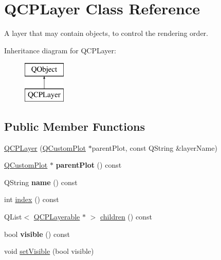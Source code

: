 \hypertarget{class_q_c_p_layer}{}\section{Q\+C\+P\+Layer Class Reference}
\label{class_q_c_p_layer}


A layer that may contain objects, to control the rendering order.  


Inheritance diagram for Q\+C\+P\+Layer\+:\begin{figure}[H]
\begin{center}
\leavevmode
\includegraphics[height=2.000000cm]{class_q_c_p_layer}
\end{center}
\end{figure}
\subsection*{Public Member Functions}
\begin{DoxyCompactItemize}
\item 
\hyperlink{class_q_c_p_layer_a5d0657fc86d624e5efbe930ef21af718}{Q\+C\+P\+Layer} (\hyperlink{class_q_custom_plot}{Q\+Custom\+Plot} $\ast$parent\+Plot, const Q\+String \&layer\+Name)
\item 
\hypertarget{class_q_c_p_layer_a5520019787482e13857ebe631c27c3fa}{}\label{class_q_c_p_layer_a5520019787482e13857ebe631c27c3fa} 
\hyperlink{class_q_custom_plot}{Q\+Custom\+Plot} $\ast$ {\bfseries parent\+Plot} () const
\item 
\hypertarget{class_q_c_p_layer_a37806f662b50b588fb1029a14fc5ef50}{}\label{class_q_c_p_layer_a37806f662b50b588fb1029a14fc5ef50} 
Q\+String {\bfseries name} () const
\item 
int \hyperlink{class_q_c_p_layer_ad322905c4700dcc7ceba63e011c730d2}{index} () const
\item 
Q\+List$<$ \hyperlink{class_q_c_p_layerable}{Q\+C\+P\+Layerable} $\ast$ $>$ \hyperlink{class_q_c_p_layer_a183b90941fc78f0b136edd77c5fb6966}{children} () const
\item 
\hypertarget{class_q_c_p_layer_ad1cc2d6b32d2abb33c7f449b964e068c}{}\label{class_q_c_p_layer_ad1cc2d6b32d2abb33c7f449b964e068c} 
bool {\bfseries visible} () const
\item 
void \hyperlink{class_q_c_p_layer_ac07671f74edf6884b51a82afb2c19516}{set\+Visible} (bool visible)
\end{DoxyCompactItemize}
